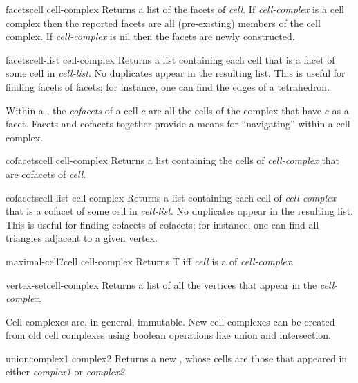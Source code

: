 \begin{methoddef}{facets}{cell cell-complex}
Returns a list of the facets of {\em cell}.  If {\em cell-complex} is a
cell complex then the reported facets are all (pre-existing) members
of the cell complex.  If {\em cell-complex} is {\sf nil} then the
facets are newly constructed.
\end{methoddef}

\begin{methoddef}{facets}{cell-list cell-complex}
Returns a list containing each cell that is a facet of some cell in 
{\em cell-list}.  No duplicates appear in the resulting list.  This is
useful for finding facets of facets; for instance, one can find the
edges of a tetrahedron.
\end{methoddef}

Within a , the {\em cofacets} of a cell $c$ are all
the cells of the complex that have $c$ as a facet.  {\sf Facets} and
{\sf cofacets} together provide a means for ``navigating'' within a
cell complex.

\begin{methoddef}{cofacets}{cell cell-complex}
Returns a list containing the cells of {\em cell-complex} that are
cofacets of {\em cell}.
\end{methoddef}

\begin{methoddef}{cofacets}{cell-list cell-complex}
Returns a list containing each cell of {\em cell-complex} that is a
cofacet of some cell in {\em cell-list}.  No duplicates appear in the
resulting list.  This is useful for finding cofacets of cofacets; for
instance, one can find all triangles adjacent to a given vertex.
\end{methoddef}

\begin{methoddef}{maximal-cell?}{cell cell-complex}
Returns {\sf T} iff {\em cell} is a  of {\em
cell-complex}.
\end{methoddef}

\begin{methoddef}{vertex-set}{cell-complex}
Returns a list of all the vertices that appear in the {\em
cell-complex}.
\end{methoddef}

Cell complexes are, in general, immutable. New cell complexes can be
created from old cell complexes using boolean operations like union
and intersection.
  
\begin{functiondef}{union}{complex1 complex2}
Returns a new , whose cells are those that appeared
in either {\em complex1} or {\em complex2}.
\end{functiondef}

